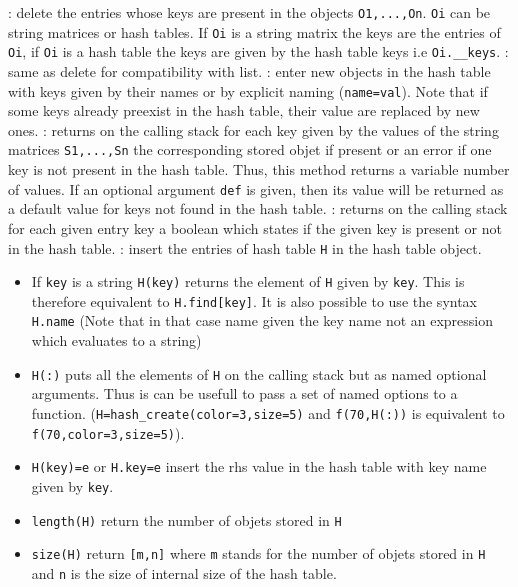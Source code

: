   \begin{varlist}
  : delete the entries whose keys are present in the objects
  \verb+O1,...,On+. \verb+Oi+ can be string matrices or hash tables. If \verb+Oi+ is 
  a string matrix the keys are the entries of \verb+Oi+, if \verb+Oi+ is a hash table the 
  keys are given by the hash table keys i.e \verb+Oi.__keys+.
  : same as delete for compatibility with list.
  : enter new objects in the hash table with keys 
  given by their names or by explicit naming (\verb+name=val+). Note that if some keys 
  already preexist in the hash table, their value are replaced by new ones. 
  : returns on the calling stack for each key given by the values of 
  the string matrices \verb+S1,...,Sn+ the corresponding stored objet if present or an 
  error if one key is not present in the hash table. Thus, this method returns a variable 
  number of values. If an optional argument \verb+def+ is given, then its value will be 
  returned as a default value for keys not found in the hash table.
  : returns on the calling stack for each given entry key a boolean 
  which states if the given key is present or not in the hash table.
  : insert the entries of hash table \verb+H+ in the hash table object.
  \end{varlist}

\begin{itemize}
\item If \verb+key+ is a string \verb+H(key)+ returns the element of \verb+H+ given by \verb+key+. 
  This is therefore equivalent to \verb+H.find[key]+. It is also possible to use 
  the syntax \verb+H.name+ (Note that in that case name given the key name not an expression 
  which evaluates to a string) 
\item \verb+H(:)+ puts all the elements of \verb+H+ on the calling stack but as named 
  optional arguments. Thus is can be usefull to pass a set of named options to a function. 
  (\verb+H=hash_create(color=3,size=5)+ and \verb+f(70,H(:))+ is equivalent to 
  \verb+f(70,color=3,size=5)+).
\item \verb+H(key)=e+ or \verb+H.key=e+ insert the rhs value in the hash table with key name 
  given by \verb+key+.
\end{itemize}

\begin{itemize}
   \item \verb+length(H)+ return the number of objets stored in \verb+H+
   \item \verb+size(H)+ return \verb+[m,n]+ where \verb+m+ stands for the number 
     of objets stored in \verb+H+ and \verb+n+ is the size of internal size of 
     the hash table. 
\end{itemize}

